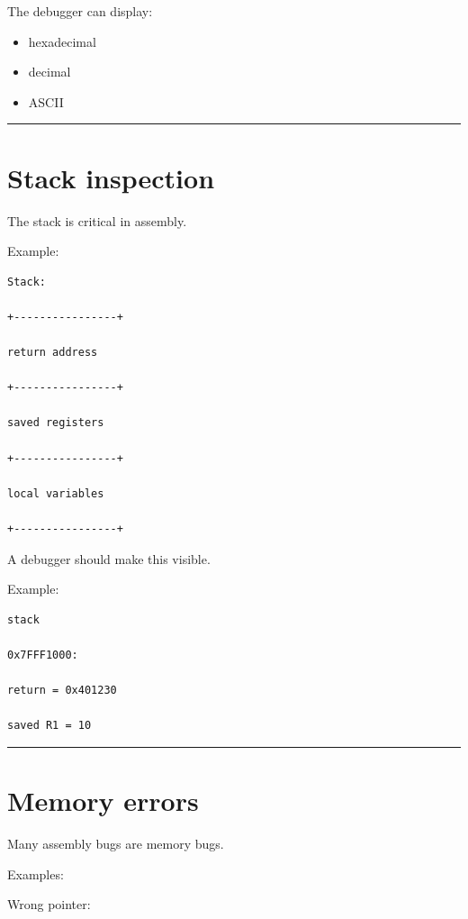 \documentclass[
  oneside,
  openany]{book}
\providecommand{\tightlist}{%
  \setlength{\itemsep}{0pt}\setlength{\parskip}{0pt}}
\begin{document}
The debugger can display:

\begin{itemize}
\tightlist
\item
  hexadecimal
\item
  decimal
\item
  ASCII
\end{itemize}

\begin{center}\rule{0.5\linewidth}{0.5pt}\end{center}

\hypertarget{stack-inspection}{%
\section{Stack inspection}\label{stack-inspection}}

The stack is critical in assembly.

Example:

\begin{verbatim}
Stack:

+----------------+

return address

+----------------+

saved registers

+----------------+

local variables

+----------------+
\end{verbatim}

A debugger should make this visible.

Example:

\begin{verbatim}
stack

0x7FFF1000:

return = 0x401230

saved R1 = 10
\end{verbatim}

\begin{center}\rule{0.5\linewidth}{0.5pt}\end{center}

\hypertarget{memory-errors}{%
\section{Memory errors}\label{memory-errors}}

Many assembly bugs are memory bugs.

Examples:

Wrong pointer:
\end{document}
